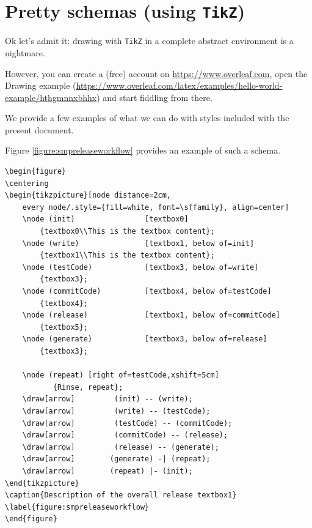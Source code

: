 

\section{Pretty schemas (using \texttt{TikZ})}

Ok let's admit it: drawing with \texttt{TikZ} in a complete abstract environment is a nightmare.

However, you can create a (free) account on \url{https://www.overleaf.com}, open the Drawing example
(\url{https://www.overleaf.com/latex/examples/hello-world-example/hthgmnnxbhhx}) and start fiddling
from there.

We provide a few examples of what we can do with styles included with the present document.

Figure \ref{figure:smpreleaseworkflow} provides an example of such a schema.

\begin{lstlisting}[style=Latex-color,caption={my-listing}]
\begin{figure}
\centering
\begin{tikzpicture}[node distance=2cm,
    every node/.style={fill=white, font=\sffamily}, align=center]
    \node (init)                [textbox0]
        {textbox0\\This is the textbox content};
    \node (write)               [textbox1, below of=init]
        {textbox1\\This is the textbox content};
    \node (testCode)            [textbox3, below of=write]
        {textbox3};
    \node (commitCode)          [textbox4, below of=testCode]
        {textbox4};
    \node (release)             [textbox1, below of=commitCode]
        {textbox5};
    \node (generate)            [textbox3, below of=release]
        {textbox3};

    \node (repeat) [right of=testCode,xshift=5cm]
           {Rinse, repeat};
    \draw[arrow]         (init) -- (write);
    \draw[arrow]         (write) -- (testCode);
    \draw[arrow]         (testCode) -- (commitCode);
    \draw[arrow]         (commitCode) -- (release);
    \draw[arrow]         (release) -- (generate);
    \draw[arrow]        (generate) -| (repeat);
    \draw[arrow]        (repeat) |- (init);
\end{tikzpicture}
\caption{Description of the overall release textbox1}
\label{figure:smpreleaseworkflow}
\end{figure}
\end{lstlisting}

